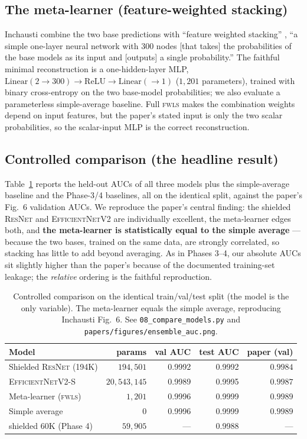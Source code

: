 \documentclass[11pt,letterpaper]{article}
\newcommand{\ResNet}{\textsc{ResNet}}
\newcommand{\EffNet}{\textsc{EfficientNetV2}}
\newcommand{\FWLS}{\textsc{fwls}}
\newcommand{\rResnetVal}{0.9992}     %
\newcommand{\rResnetTest}{0.9992}    %
\newcommand{\rEffVal}{0.9989}        %
\newcommand{\rEffTest}{0.9995}       %
\newcommand{\rMetaVal}{0.9996}       %
\newcommand{\rMetaTest}{0.9999}      %
\newcommand{\rAvgVal}{0.9996}        %
\newcommand{\rAvgTest}{0.9999}       %
\newcommand{\rSixtyKTest}{0.9988}    %
\begin{document}
\subsection{The meta-learner (feature-weighted stacking)}

Inchausti combine the two base predictions with ``feature weighted stacking''
\citep{coscrato2020nnstacking}, ``a simple one-layer neural network with 300
nodes [that takes] the probabilities of the base models as its input and
[outputs] a single probability.'' The faithful minimal reconstruction is a
one-hidden-layer MLP, $\mathrm{Linear}(2\!\to\!300)\to\mathrm{ReLU}\to
\mathrm{Linear}(\!\to\!1)$ ($1{,}201$ parameters), trained with binary
cross-entropy on the two base-model probabilities; we also evaluate a
parameterless simple-average baseline. Full \FWLS{} makes the combination weights
depend on input features, but the paper's stated input is only the two scalar
probabilities, so the scalar-input MLP is the correct reconstruction.

\subsection{Controlled comparison (the headline result)}

Table~\ref{tab:auc} reports the held-out AUCs of all three models plus the
simple-average baseline and the Phase-3/4 baselines, all on the identical split,
against the paper's Fig.~6 validation AUCs. We reproduce the paper's central
finding: the shielded \ResNet{} and \EffNet{} are individually excellent, the
meta-learner edges both, and \textbf{the meta-learner is statistically equal to
the simple average} --- because the two bases, trained on the same data, are
strongly correlated, so stacking has little to add beyond averaging. As in
Phases 3--4, our absolute AUCs sit slightly higher than the paper's because of
the documented training-set leakage; the \emph{relative} ordering is the faithful
reproduction.

\begin{table}[htbp]
\centering
\begin{tabular}{lrrrr}
\toprule
Model & params & val AUC & test AUC & paper (val) \\
\midrule
Shielded \ResNet{} (194K) & $194{,}501$ & \rResnetVal{} & \rResnetTest{} & $0.9984$ \\
\EffNet{}-S               & $20{,}543{,}145$ & \rEffVal{} & \rEffTest{} & $0.9987$ \\
Meta-learner (\FWLS{})    & $1{,}201$ & \rMetaVal{} & \rMetaTest{} & $0.9989$ \\
Simple average            & $0$ & \rAvgVal{} & \rAvgTest{} & $0.9989$ \\
\midrule
shielded 60K (Phase 4)    & $59{,}905$ & --- & \rSixtyKTest{} & --- \\
\bottomrule
\end{tabular}
\caption{Controlled comparison on the identical train/val/test split (the model
is the only variable). The meta-learner equals the simple average, reproducing
Inchausti Fig.~6. See \texttt{08\_compare\_models.py} and
\texttt{papers/figures/ensemble\_auc.png}.}
\label{tab:auc}
\end{table}
\end{document}
